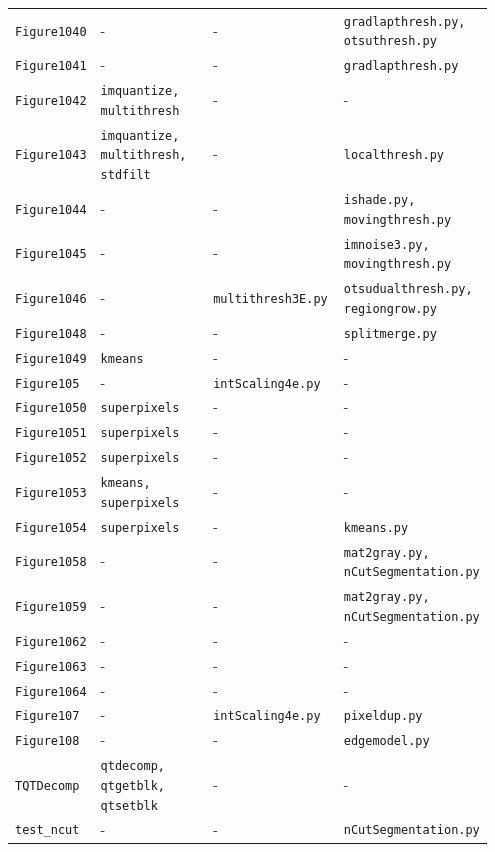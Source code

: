 \documentclass[10pt]{article}
\begin{document}
\begin{longtable}{p{0.11\linewidth} p{0.28\linewidth} p{0.28\linewidth} p{0.28\linewidth}}
\texttt{Figure1040} & - & - & \texttt{gradlapthresh.py, otsuthresh.py} \\
\texttt{Figure1041} & - & - & \texttt{gradlapthresh.py} \\
\texttt{Figure1042} & \texttt{imquantize, multithresh} & - & - \\
\texttt{Figure1043} & \texttt{imquantize, multithresh, stdfilt} & - & \texttt{localthresh.py} \\
\texttt{Figure1044} & - & - & \texttt{ishade.py, movingthresh.py} \\
\texttt{Figure1045} & - & - & \texttt{imnoise3.py, movingthresh.py} \\
\texttt{Figure1046} & - & \texttt{multithresh3E.py} & \texttt{otsudualthresh.py, regiongrow.py} \\
\texttt{Figure1048} & - & - & \texttt{splitmerge.py} \\
\texttt{Figure1049} & \texttt{kmeans} & - & - \\
\texttt{Figure105} & - & \texttt{intScaling4e.py} & - \\
\texttt{Figure1050} & \texttt{superpixels} & - & - \\
\texttt{Figure1051} & \texttt{superpixels} & - & - \\
\texttt{Figure1052} & \texttt{superpixels} & - & - \\
\texttt{Figure1053} & \texttt{kmeans, superpixels} & - & - \\
\texttt{Figure1054} & \texttt{superpixels} & - & \texttt{kmeans.py} \\
\texttt{Figure1058} & - & - & \texttt{mat2gray.py, nCutSegmentation.py} \\
\texttt{Figure1059} & - & - & \texttt{mat2gray.py, nCutSegmentation.py} \\
\texttt{Figure1062} & - & - & - \\
\texttt{Figure1063} & - & - & - \\
\texttt{Figure1064} & - & - & - \\
\texttt{Figure107} & - & \texttt{intScaling4e.py} & \texttt{pixeldup.py} \\
\texttt{Figure108} & - & - & \texttt{edgemodel.py} \\
\texttt{TQTDecomp} & \texttt{qtdecomp, qtgetblk, qtsetblk} & - & - \\
\texttt{test\_ncut} & - & - & \texttt{nCutSegmentation.py} \\
\end{longtable}
\end{document}
